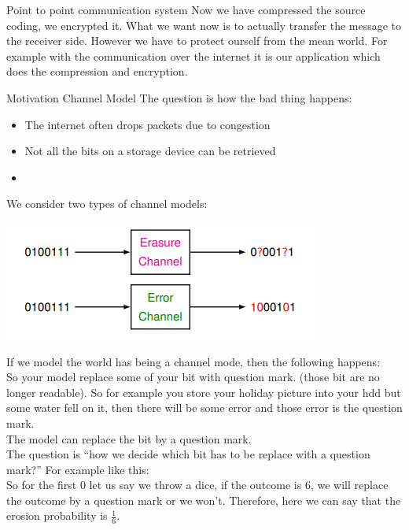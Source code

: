 

\begin{parag}{Point to point communication system}
    Now we have compressed the source coding, we encrypted it. What we want now is to actually transfer the message to the receiver side. However we have to protect ourself from the mean world. For example with the communication over the internet it is our application which does the compression and encryption.
\end{parag}


\begin{parag}{Motivation Channel Model}
    The question is how the bad thing happens:
    \begin{itemize}
        \item The internet often drops packets due to congestion
        \item Not all the bits on a storage device can be retrieved
        \item {}
    \end{itemize}
    We consider two types of channel models:
    \begin{center}
        \includegraphics[scale=1]{12025-04-29.png}
    \end{center}
    If we model the world has being a  channel mode, then the following happens:\\
    So your model replace some of your bit with question mark. (those bit are no longer readable). So for example you store your holiday picture into your hdd but some water fell on it, then there will be some error and those error is the question mark.\\
    The model can  replace the bit by a question mark.\\
The question is ``how we decide which bit has to be replace with a question mark?'' For example like this:\\
    So for the first $0$ let us say we throw a dice, if the outcome is $6$, we will replace the outcome by a question mark or we won't. Therefore, here we can say that the erosion probability is $\frac{1}{6}$.\\

\end{parag}
